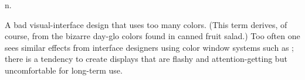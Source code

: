  n.

A bad visual-interface design that uses too many colors. (This term derives, of course, from the bizarre day-glo colors found in canned
fruit salad.) Too often one sees similar effects from interface designers using color window systems such as ; there is a
tendency to create displays that are flashy and attention-getting but uncomfortable for long-term use.

